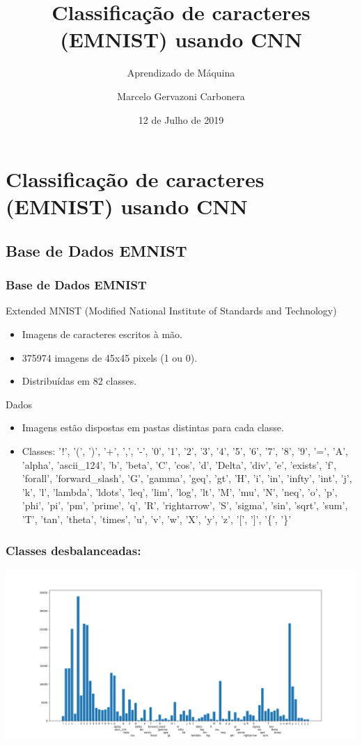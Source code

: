 \documentclass[hyperref={pdfpagelabels=false},table]{beamer}
\title[Marcelo Gervazoni Carbonera]{Classificação de
caracteres (EMNIST) usando CNN}
\subtitle{Aprendizado de Máquina}
\author[Aprendizado de Máquina]{Marcelo Gervazoni Carbonera}{}
\institute[UTFPR]{ 
\small{\textbf{Universidade Tecnológica Federal do Paraná}}\\
Câmpus Pato Branco}
\date{12 de Julho de 2019}
\begin{document}
\begin{frame}
	\titlepage
\end{frame}

\section{Classificação de caracteres (EMNIST) usando CNN}

\subsection{Base de Dados EMNIST}
\begin{frame}
	\frametitle{Base de Dados EMNIST}
	\begin{exampleblock}{Extended MNIST (Modified National Institute of Standards
	and Technology)}
		\begin{itemize}
		  \item Imagens de caracteres escritos à mão. 
		  \item 375974 imagens de 45x45 pixels (1 ou 0).
		  \item Distribuídas em 82 classes.
		\end{itemize}
	\end{exampleblock}
	\pause
	\begin{block}{Dados}
		\begin{itemize}
		  \item Imagens estão dispostas em pastas distintas para cada classe.
		  \item Classes: '!', '(', ')', '+', ',', '-', '0', '1', '2', '3', '4', '5',
		  '6', '7', '8', '9', '=', 'A', 'alpha', 'ascii\_124', 'b', 'beta', 'C',
		  'cos', 'd', 'Delta', 'div', 'e', 'exists', 'f', 'forall', 'forward\_slash',
		  'G', 'gamma', 'geq', 'gt', 'H', 'i', 'in', 'infty', 'int', 'j', 'k', 'l',
		  'lambda', 'ldots', 'leq', 'lim', 'log', 'lt', 'M', 'mu', 'N', 'neq', 'o',
		  'p', 'phi', 'pi', 'pm', 'prime', 'q', 'R', 'rightarrow', 'S', 'sigma',
		  'sin', 'sqrt', 'sum', 'T', 'tan', 'theta', 'times', 'u', 'v', 'w', 'X', 'y',
		  'z', '[', ']', '\{', '\}'
		\end{itemize}
	\end{block}
\end{frame}

\begin{frame}
	\frametitle{Classes desbalanceadas:}
	\includegraphics[scale = 0.305,trim = {5cm 0.5cm 5cm
	3cm}]{Figuras/Desbalanceado}
\end{frame}
\end{document}

